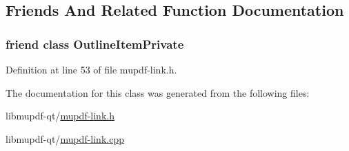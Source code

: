 \subsection{Friends And Related Function Documentation}
\hypertarget{class_mu_p_d_f_1_1_link_goto_ab008ed670017e41b6e6bba8707c775d2}{
\subsubsection[{Outline\-Item\-Private}]{\setlength{\rightskip}{0pt plus 5cm}friend class Outline\-Item\-Private\hspace{0.3cm}{\ttfamily [friend]}}}\label{class_mu_p_d_f_1_1_link_goto_ab008ed670017e41b6e6bba8707c775d2}


Definition at line 53 of file mupdf-\/link.\-h.



The documentation for this class was generated from the following files\-:\begin{DoxyCompactItemize}
\item 
libmupdf-\/qt/\hyperlink{mupdf-link_8h}{mupdf-\/link.\-h}\item 
libmupdf-\/qt/\hyperlink{mupdf-link_8cpp}{mupdf-\/link.\-cpp}\end{DoxyCompactItemize}
